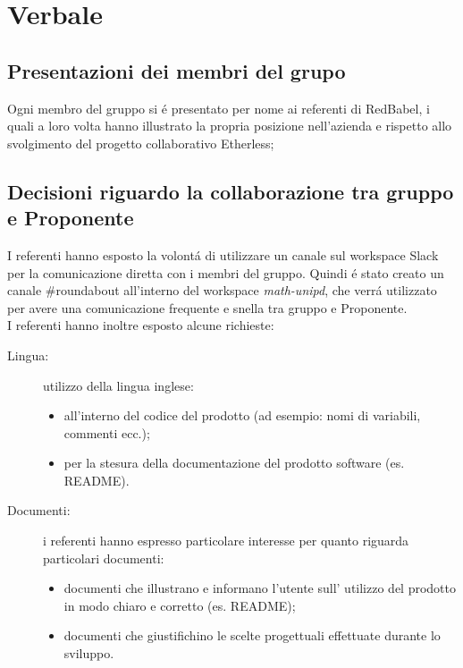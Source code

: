 \section{Verbale}
\subsection{Presentazioni dei membri del grupo \Gruppo}
Ogni membro del gruppo \Gruppo si é presentato per nome ai referenti di RedBabel, i quali a loro volta hanno illustrato la propria posizione nell'azienda e rispetto allo svolgimento del progetto collaborativo Etherless;

\subsection{Decisioni riguardo la collaborazione tra gruppo e Proponente}
I referenti hanno esposto la volontá di utilizzare un canale sul workspace %
Slack per la comunicazione diretta con i membri del gruppo. Quindi é stato creato un canale \#roundabout all'interno del workspace \textit{math-unipd}, che verrá utilizzato per avere una comunicazione frequente e snella tra gruppo e Proponente.\\
I referenti hanno inoltre esposto alcune richieste:
\begin{description}
	\item[Lingua:] utilizzo della lingua inglese:
		\begin{itemize}
			\item all'interno del codice del prodotto (ad esempio: nomi di variabili, commenti ecc.);
			\item per la stesura della documentazione del prodotto software (es. README).
		\end{itemize}
	\item[Documenti:] i referenti hanno espresso particolare interesse per quanto riguarda particolari documenti:
		\begin{itemize}
			\item documenti che illustrano e informano l'utente sull' utilizzo del prodotto in modo chiaro e corretto (es. README);
			\item documenti che giustifichino le scelte progettuali effettuate durante lo sviluppo.
		\end{itemize}
\end{description}


